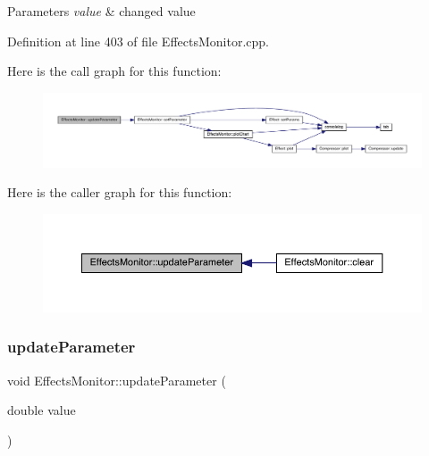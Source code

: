 \begin{DoxyParams}{Parameters}
{\em value} & changed value \\
\hline
\end{DoxyParams}


Definition at line 403 of file Effects\+Monitor.\+cpp.

Here is the call graph for this function\+:
\nopagebreak
\begin{figure}[H]
\begin{center}
\leavevmode
\includegraphics[width=350pt]{class_effects_monitor_ae2cc992b9bb457da2a0cdab854a414ea_cgraph}
\end{center}
\end{figure}
Here is the caller graph for this function\+:
\nopagebreak
\begin{figure}[H]
\begin{center}
\leavevmode
\includegraphics[width=350pt]{class_effects_monitor_ae2cc992b9bb457da2a0cdab854a414ea_icgraph}
\end{center}
\end{figure}
\mbox{\label{class_effects_monitor_aa32c90185185305770ad5ab911641e17}} 
\subsubsection{\texorpdfstring{update\+Parameter}{updateParameter}\hspace{0.1cm}{\footnotesize\ttfamily [2/4]}}
{\footnotesize\ttfamily void Effects\+Monitor\+::update\+Parameter (\begin{DoxyParamCaption}\item[{double}]{value }\end{DoxyParamCaption})\hspace{0.3cm}{\ttfamily [slot]}}


